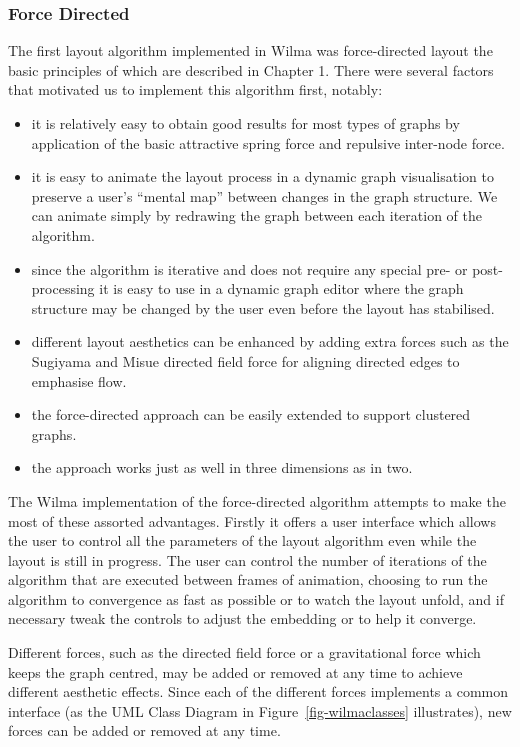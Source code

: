\documentclass[runningheads]{cl2emult}
\begin{document}
\subsubsection{Force Directed} \label{sec:forcedirectedlayout}
The first layout algorithm implemented in Wilma was force-directed
layout the basic principles of which are described in Chapter
1.  There were several factors that motivated us to
implement this algorithm first, notably:
\begin{itemize}
\item it is relatively easy to obtain good results for most types of
graphs by application of the basic attractive spring force and
repulsive inter-node force.
\item it is easy to animate the layout process in a dynamic
graph visualisation to preserve a user's ``mental map''\cite{Misue:VLC95}
between changes in the graph structure.  We can animate simply by
redrawing the graph between each iteration of the algorithm.
\item since the algorithm is iterative and does not require any
special pre- or post-processing it is easy to use in a dynamic graph
editor where the graph structure may be changed by the user even
before the layout has stabilised.
\item different layout
aesthetics can be enhanced by adding extra forces such as the Sugiyama and Misue\cite{Sugiyama:VLC95}
directed field force for aligning directed edges to emphasise flow.
\item the force-directed approach can be easily extended to support
clustered graphs\cite{Huang:GD98}.
\item the approach works just as well in three dimensions as in two.
\end{itemize}
The Wilma implementation of the force-directed algorithm attempts to make the most
of these assorted advantages.  Firstly it offers a user interface which
allows the user to control all the parameters of the layout algorithm
even while the layout is still in progress.  The user can control the
number of iterations of the algorithm that are executed between frames
of animation, choosing to run the algorithm to
convergence as fast as possible or to watch the layout unfold, and if
necessary tweak the controls to adjust the embedding or to help it
converge.

Different forces, such as the directed field force or a gravitational force
which keeps the graph centred, may be added or removed at any time to achieve
different aesthetic effects.  Since each of the different forces implements a
common interface (as the UML Class Diagram in Figure~\ref{fig-wilmaclasses}
illustrates), new forces can be added or removed at any time.
\end{document}
